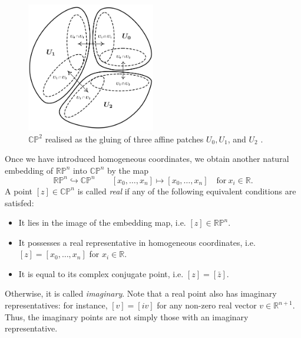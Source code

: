 \documentclass[10pt, a4paper]{article}
\theoremstyle{BoldTopSpacing}
\theoremstyle{BoldTopSpacing}
\theoremstyle{BoldTopSpacing}
\theoremstyle{BoldTopBottomSpacing}
\theoremstyle{BoldTopSpacing}
\theoremstyle{BoldTopBottomSpacing}
\theoremstyle{remark}
\begin{document}
\begin{figure}[H]
    \centering
    \includegraphics[width=0.5\textwidth]{affine-patches.png}
    \caption[$\mathbb{C}\mathbb{P}^2$ realised as the gluing of three affine patches $U_0, U_1$, and $U_2$.]{$\mathbb{C}\mathbb{P}^2$ realised as the gluing of three affine patches $U_0, U_1$, and $U_2$ \cite{toricfanovarieties2005}.}
    \label{fig:affine-patches-diagram}
\end{figure}

Once we have introduced homogeneous coordinates, we obtain another natural embedding of $\mathbb{R}\mathbb{P}^n$ into $\mathbb{C}\mathbb{P}^n$ by the map
\[
    \mathbb{R}\mathbb{P}^n \hookrightarrow \mathbb{C}\mathbb{P}^n \quad \quad [x_{0}, \dots, x_{n}] \mapsto [x_{0}, \dots, x_{n}] \quad \text{for} \ x_{i} \in \mathbb{R}.
\]
A point $[z] \in \mathbb{C}\mathbb{P}^n$ is called \textit{real} if any of the following equivalent conditions are satisfed:
\begin{itemize}
    \item It lies in the image of the embedding map, i.e. $[z] \in \mathbb{R}\mathbb{P}^n$.
    \item It possesses a real representative in homogeneous coordinates, i.e. $[z] = [x_{0}, \dots, x_{n}]$ for $x_{i} \in \mathbb{R}$.
    \item It is equal to its complex conjugate point, i.e. $[z] = [\bar{z}]$.
\end{itemize}
Otherwise, it is called \textit{imaginary}. Note that a real point also has imaginary representatives: for instance, $[v] = [i v]$ for any non-zero real vector $v \in \mathbb{R}^{n+1}$. Thus, the imaginary points are not simply those with an imaginary representative.
\end{document}
